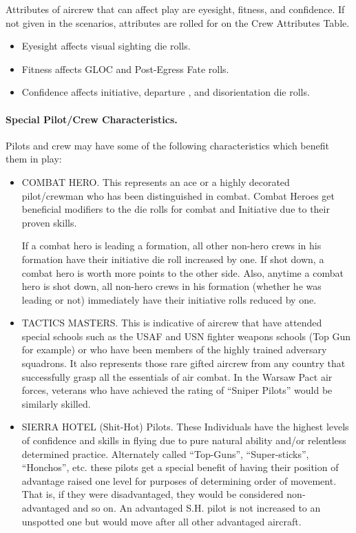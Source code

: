 \begin{advancedrules}
Attributes of aircrew that can affect play are eyesight, fitness, and confidence. If not given in the scenarios, attributes are rolled for on the Crew Attributes Table.

\begin{itemize}
    \item Eyesight affects visual sighting die rolls.
    \item Fitness affects GLOC and Post-Egress Fate rolls.
    \item Confidence affects initiative, departure , and disorientation die rolls.
\end{itemize}

\paragraph{Special Pilot/Crew Characteristics.} Pilots and crew may have some of the following characteristics which benefit them in play:

\begin{itemize}

    \item COMBAT HERO. This represents an ace or a highly decorated pilot/crewman who has been distinguished in combat. Combat Heroes get beneficial modifiers to the die rolls for combat and Initiative due to their proven skills.

    If a combat hero is leading a formation, all other non-hero crews in his formation have their initiative die roll increased by one.  If shot down, a combat hero is worth more points to the other side. Also, anytime a combat hero is shot down, all non-hero crews in his formation (whether he was leading or not) immediately have their initiative rolls reduced by one.

    \item TACTICS MASTERS. This is indicative of aircrew that have attended special schools such as the USAF and USN fighter weapons schools (Top Gun for example) or who have been members of the highly trained adversary squadrons. It also represents those rare gifted aircrew from any country that successfully grasp all the essentials of air combat. In the Warsaw Pact air forces, veterans who have achieved the rating of “Sniper Pilots” would be similarly skilled.
    
    \item SIERRA HOTEL (Shit-Hot) Pilots. These Individuals have the highest levels of confidence and skills in flying due to pure natural ability and/or relentless determined practice. Alternately called “Top-Guns”, “Super-sticks”, “Honchos”, etc. these pilots get a special benefit of having their position of advantage raised one level for purposes of determining order of movement. That is, if they were disadvantaged, they would be considered non-advantaged and so on. An advantaged S.H. pilot is not increased to an unspotted one but would move after all other advantaged aircraft. 


\end{itemize}
\end{advancedrules}
